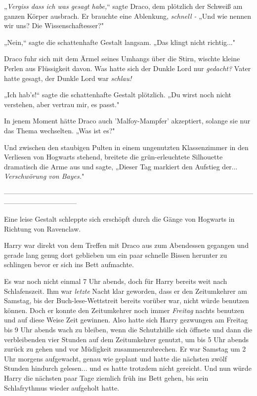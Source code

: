 {„\emph{Vergiss dass ich was gesagt habe,}“ sagte Draco, dem plötzlich der Schweiß am ganzen Körper ausbrach. Er brauchte eine Ablenkung, \emph{schnell -} „Und wie nennen wir uns? Die Wissenschaftesser?"

„Nein,“ sagte die schattenhafte Gestalt langsam. „Das klingt nicht richtig..."

Draco fuhr sich mit dem Ärmel seines Umhangs über die Stirn, wischte kleine Perlen aus Flüssigkeit davon. Was hatte sich der Dunkle Lord nur \emph{gedacht?} Vater hatte gesagt, der Dunkle Lord war \emph{schlau!}

„Ich hab's!“ sagte die schattenhafte Gestalt plötzlich. „Du wirst noch nicht verstehen, aber vertrau mir, es passt."

In jenem Moment hätte Draco auch 'Malfoy-Mampfer' akzeptiert, solange sie nur das Thema wechselten. „Was ist es?"

Und zwischen den staubigen Pulten in einem ungenutzten Klassenzimmer in den Verliesen von Hogwarts stehend, breitete die grün-erleuchtete Silhouette dramatisch die Arme aus und sagte, „Dieser Tag markiert den Aufstieg der... \emph{Verschwörung von Bayes.}"

--------------------------------------------------------------------------------------------------------------------------------------------

\hfill\break Eine leise Gestalt schleppte sich erschöpft durch die Gänge von Hogwarts in Richtung von Ravenclaw.

Harry war direkt von dem Treffen mit Draco aus zum Abendessen gegangen und gerade lang genug dort geblieben um ein paar schnelle Bissen herunter zu schlingen bevor er sich ins Bett aufmachte.

Es war noch nicht einmal 7 Uhr abends, doch für Harry bereits weit nach Schlafenszeit. Ihm war \emph{letzte} Nacht klar geworden, dass er den Zeitumkehrer am Samstag, bis der Buch-lese-Wettstreit bereits vorüber war, nicht würde benutzen können. Doch er konnte den Zeitumkehrer noch immer \emph{Freitag} nachts benutzen und auf diese Weise Zeit gewinnen. Also hatte sich Harry gezwungen am Freitag bis 9 Uhr abends wach zu bleiben, wenn die Schutzhülle sich öffnete und dann die verbleibenden vier Stunden auf dem Zeitumkehrer genutzt, um bis 5 Uhr abends zurück zu gehen und vor Müdigkeit zusammenzubrechen. Er war Samstag um 2 Uhr morgens aufgewacht, genau wie geplant und hatte die nächsten zwölf Stunden hindurch gelesen... und es hatte trotzdem nicht gereicht. Und nun würde Harry die nächsten paar Tage ziemlich früh ins Bett gehen, bis sein Schlafrythmus wieder aufgeholt hatte.

}
